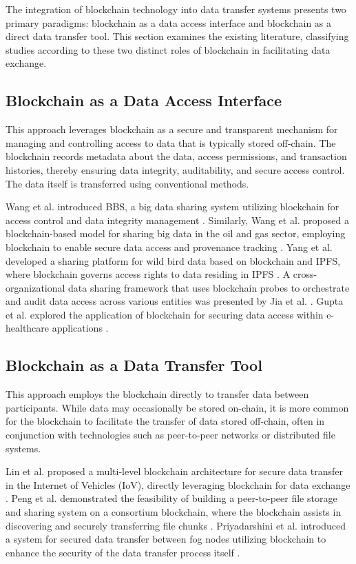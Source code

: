 \documentclass[10pt]{llncs}
\begin{document}
The integration of blockchain technology into data transfer systems presents two primary paradigms: blockchain as a data access interface and blockchain as a direct data transfer tool. 
This section examines the existing literature, classifying studies according to these two distinct roles of blockchain in facilitating data exchange.

\subsection{Blockchain as a Data Access Interface}

This approach leverages blockchain as a secure and transparent mechanism for managing and controlling access to data that is typically stored off-chain. 
The blockchain records metadata about the data, access permissions, and transaction histories, thereby ensuring data integrity, auditability, and 
secure access control. 
The data itself is transferred using conventional methods.

Wang et al. introduced BBS, a big data sharing system utilizing blockchain for access control and data integrity management \cite{Wang2024}. 
Similarly, Wang et al. proposed a blockchain-based model for sharing big data in the oil and gas sector, employing blockchain to enable secure data 
access and provenance tracking \cite{WangYY2021}. 
Yang et al. developed a sharing platform for wild bird data based on blockchain and IPFS, where blockchain governs access rights to data residing in IPFS \cite{Yang2022}. 
A cross-organizational data sharing framework that uses blockchain probes to orchestrate and audit data access across various entities was presented by Jia et al. \cite{Jia2023}. 
Gupta et al. explored the application of blockchain for securing data access within e-healthcare applications \cite{Gupta2022}.

\subsection{Blockchain as a Data Transfer Tool}

This approach employs the blockchain directly to transfer data between participants.
While data may occasionally be stored on-chain, it is more common for the blockchain to facilitate the transfer of data stored off-chain,
 often in conjunction with technologies such as peer-to-peer networks or distributed file systems.

Lin et al. proposed a multi-level blockchain architecture for secure data transfer in the Internet of Vehicles (IoV), 
directly leveraging blockchain for data exchange \cite{Lin2023}. 
Peng et al. demonstrated the feasibility of building a peer-to-peer file storage and sharing system on a consortium blockchain, 
where the blockchain assists in discovering and securely transferring file chunks \cite{Peng2023}. 
Priyadarshini et al. introduced a system for secured data transfer between fog nodes utilizing blockchain to enhance the security of 
the data transfer process itself \cite{Priyadarshini2021}.
\end{document}
